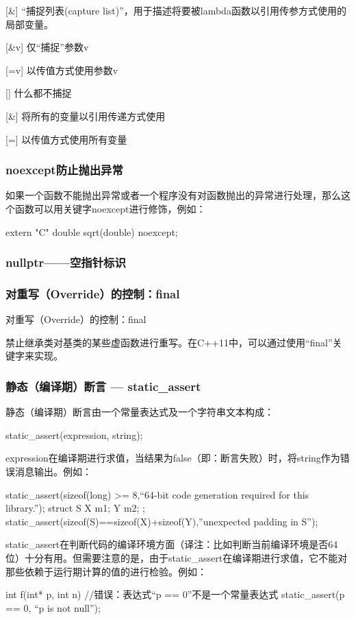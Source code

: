 [\&] “捕捉列表(capture list)”，用于描述将要被lambda函数以引用传参方式使用的局部变量。

[\&v] 仅“捕捉”参数v

[=v] 以传值方式使用参数v

[] 什么都不捕捉

[\&] 将所有的变量以引用传递方式使用

[=] 以传值方式使用所有变量

\subsubsection{noexcept防止抛出异常}
如果一个函数不能抛出异常或者一个程序没有对函数抛出的异常进行处理，那么这个函数可以用关键字noexcept进行修饰，例如：

extern "C" double sqrt(double) noexcept;

\subsubsection{nullptr——空指针标识}

\subsubsection{对重写（Override）的控制：final}
对重写（Override）的控制：final

禁止继承类对基类的某些虚函数进行重写。在C++11中，可以通过使用“final”关键字来实现。

\subsubsection{静态（编译期）断言 — static_assert}
静态（编译期）断言由一个常量表达式及一个字符串文本构成：
\begin{Code}
	static_assert(expression, string);
\end{Code}
expression在编译期进行求值，当结果为false（即：断言失败）时，将string作为错误消息输出。例如：

\begin{Code}
	static_assert(sizeof(long) >= 8,“64-bit code generation required for this library.”);
	struct S { X m1; Y m2; };
	static_assert(sizeof(S)==sizeof(X)+sizeof(Y),”unexpected padding in S”);
\end{Code}
static_assert在判断代码的编译环境方面（译注：比如判断当前编译环境是否64位）十分有用。但需要注意的是，由于static_assert在编译期进行求值，它不能对那些依赖于运行期计算的值的进行检验。例如：

\begin{Code}
	int f(int* p, int n){
		//错误：表达式“p == 0”不是一个常量表达式
		static_assert(p == 0, “p is not null”);
	}
\end{Code}
